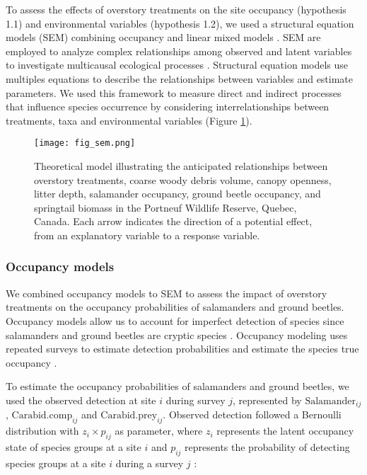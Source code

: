 To assess the effects of overstory treatments on the site occupancy (hypothesis 1.1) and environmental variables (hypothesis 1.2), we used a structural equation models (SEM) 
combining occupancy and linear mixed models \citep{graceSpecificationStructuralEquation2010,josephIntegratingOccupancyModels2016,mackenzieOccupancyEstimationModeling2006a}.
SEM are employed to analyze complex relationships among observed and latent variables to investigate multicausal ecological processes \citep{graceStructuralEquationModeling2008}.
Structural equation models use multiples equations to describe the relationships between variables and estimate parameters.
We used this framework to measure direct and indirect processes that influence species occurrence by considering interrelationships between treatments, taxa and environmental variables (Figure \ref*{fig:SEM}).

\begin{figure}[ht]
	\centering
	\texttt{[image: fig\_sem.png]}
	\caption[Theoretical model illustrating the anticipated relationships between overstory treatments, environmental variables and species groups.]
  {Theoretical model illustrating the anticipated relationships between overstory treatments, coarse woody debris volume, canopy openness, litter depth,
   salamander occupancy, ground beetle occupancy, and springtail biomass in the Portneuf Wildlife Reserve, Quebec, Canada. 
   Each arrow indicates the direction of a potential effect, from an explanatory variable to a response variable.}
	\label{fig:SEM}
\end{figure}  

\subsubsection{Occupancy models} 

We combined occupancy models to SEM to assess the impact of overstory treatments on the occupancy probabilities of salamanders and ground beetles.
Occupancy models allow us to account for imperfect detection of species since salamanders and ground beetles are cryptic species \citep{baileyEstimatingSiteOccupancy2004,spiersEstimatingSpeciesMisclassification2022}.
Occupancy modeling uses repeated surveys to estimate detection probabilities and estimate the species true occupancy \citep{mackenzieEstimatingSiteOccupancy2002,mazerolleMakingGreatLeaps2007}.

To estimate the occupancy probabilities of salamanders and ground beetles, we used the observed detection at site $i$ during survey $j$, 
represented by $\text{Salamander}_{ij}$, $\text{Carabid.comp}_{ij}$ and $\text{Carabid.prey}_{ij}$. Observed detection followed a Bernoulli distribution with $z_{i} \times p_{ij}$ as parameter, 
where $z_{i}$ represents the latent occupancy state of species groups at a site $i$ and $p_{ij}$ represents the probability of detecting species groups at a site $i$ during a survey $j$ :


